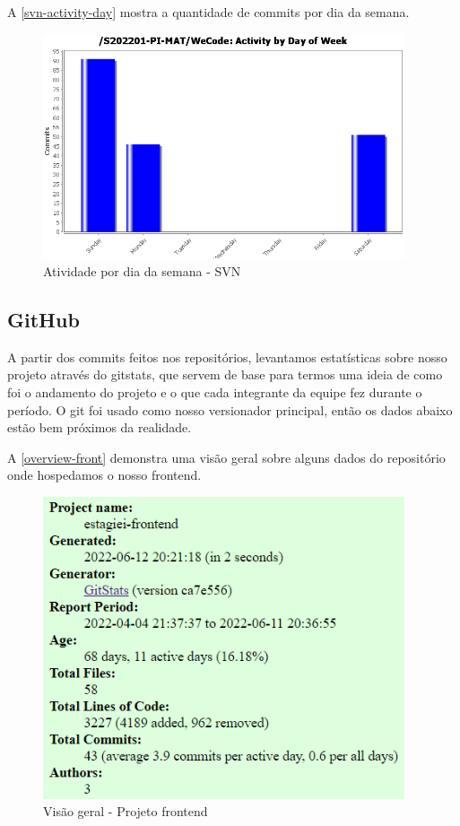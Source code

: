 A \autoref{svn-activity-day} mostra a quantidade de commits por dia da semana.
\begin{figure}[H]
	\centering
	\caption{\label{svn-activity-day}Atividade por dia da semana - SVN}
	\includegraphics[width=0.95\textwidth]{../imagens/stats/svn-activity-day.png}
\end{figure}

\subsection{GitHub}
A partir dos commits feitos nos repositórios, levantamos estatísticas sobre nosso projeto através do \gls{gitstats}, que servem de base para termos uma ideia de como foi o andamento do projeto e o que cada integrante da equipe fez durante o período.
O \gls{git} foi usado como nosso versionador principal, então os dados abaixo estão bem próximos da realidade.

A \autoref{overview-front} demonstra uma visão geral sobre alguns dados do repositório onde hospedamos o nosso \gls{frontend}.

\begin{figure}[H]
	\centering
	\caption{\label{overview-front}Visão geral - Projeto \gls{frontend}}
	\includegraphics[width=0.95\textwidth]{../imagens/stats/overview-frontend.png}
\end{figure}

